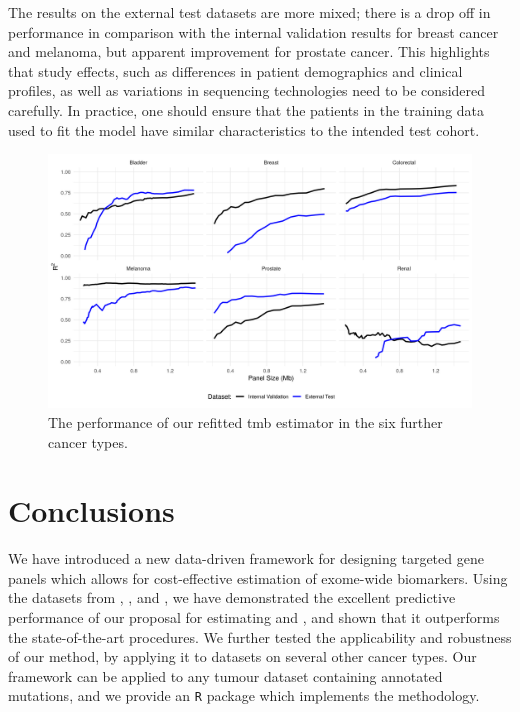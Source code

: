 \documentclass[../thesis.tex]{subfiles}
\begin{document}
{The results on the external test datasets are more mixed; there is a drop off in performance in comparison with the internal validation results for breast cancer and melanoma, but apparent improvement for prostate cancer. This highlights that study effects, such as differences in patient demographics and clinical profiles, as well as variations in sequencing technologies need to be considered carefully. In practice, one should ensure that the patients in the training data used to fit the model have similar characteristics to the intended test cohort.}

\begin{figure}[ht]
    \centering
    \includegraphics[width=6.5in]{../figures/chapter3/external_validation_fig.png} 
    \caption{The performance of our refitted \gls{tmb} estimator in the six further cancer types.    
    \label{fig:external_validation_fig}}
\end{figure}



\section{Conclusions \label{sec:conclusion}}
 We have introduced a new data-driven framework for designing targeted gene panels which allows for cost-effective estimation of exome-wide biomarkers.  Using the  datasets from \citet{campbell_distinct_2016}{,  \citet{hellmann_genomic_2018}, and \citet{rizvi_mutational_2015}}, we have demonstrated the excellent predictive performance of our proposal for estimating  and , and shown that it outperforms the state-of-the-art procedures. {We further tested the applicability and robustness of our method, by applying it to datasets on several other cancer types.}  Our framework can be applied to any tumour dataset containing annotated mutations, and we provide an \texttt{R} package \citep{bradley_icbiomark_2021} which implements the methodology.
 
\end{document}
